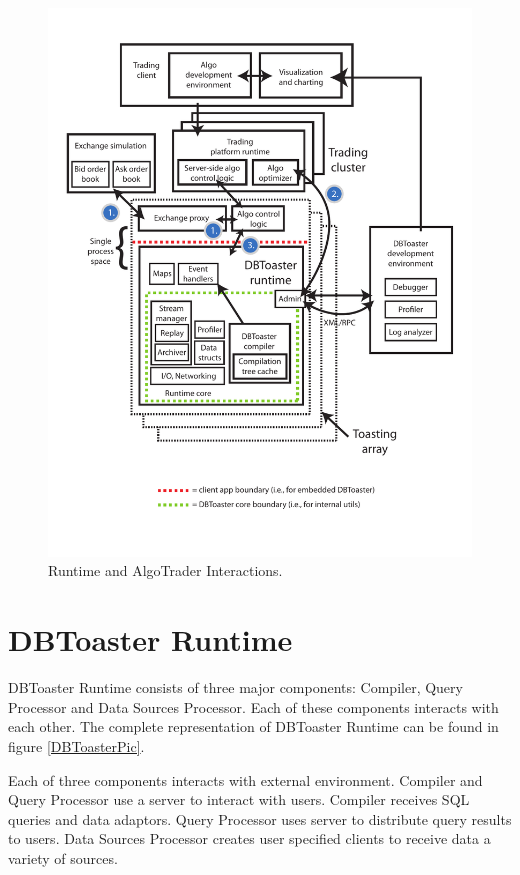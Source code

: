 \documentclass[14pt]{article}
\begin{document}
\begin{figure}
  \includegraphics[width=4.50in]{../figures/finapp.pdf}
  \caption{Runtime and AlgoTrader Interactions.}
  \label{TheBigPicture}
\end{figure}



\section{DBToaster Runtime}

DBToaster Runtime consists of three major components: Compiler, Query Processor and Data Sources Processor. Each of these components interacts with each other. The complete representation of DBToaster Runtime can be found in figure \ref{DBToasterPic}. 

Each of three components interacts with external environment. Compiler and Query Processor use a server to interact with users. Compiler receives SQL queries and data adaptors. Query Processor uses server to distribute query results to users. Data Sources Processor creates user specified clients to receive data a variety of sources. 
\end{document}
